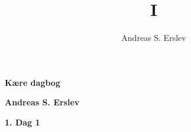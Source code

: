 \documentclass[]{article}
\title{I}
\author{Andreas S. Erslev}
\begin{document}
	
	\begin{center}
		\Large\textbf{Kære dagbog}
	\end{center}
	
	\begin{center}
		\large\textbf{Andreas S. Erslev}
	\end{center}
	
	\begin{center}
	\large\textbf{1. Dag 1}
	\end{center}
	
	
	
	
\end{document}
